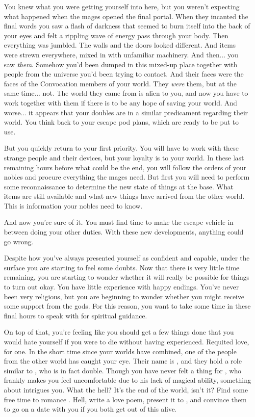 \documentclass[char]{guildcamp3}
\begin{document}
You knew what you were getting yourself into here, but you weren't expecting what happened when the mages opened the final portal. When they incanted the final words you saw a flash of darkness that seemed to burn itself into the back of your eyes and felt a rippling wave of energy pass through your body. Then everything was jumbled. The walls and the doors looked different. And items were strewn everywhere, mixed in with unfamiliar machinery. And then... you saw \emph{them}. Somehow you'd been dumped in this mixed-up place together with people from the universe you'd been trying to contact. And their faces were the faces of the Convocation members of your world. They \emph{were} them, but at the same time... not. The world they came from is alien to you, and now you have to work together with them if there is to be any hope of saving your world. And worse... it appears that your doubles are in a similar predicament regarding their world. You think back to your escape pod plans, which are ready to be put to use.

But you quickly return to your first priority. You will have to work with these strange people and their devices, but your loyalty is to your world. In these last remaining hours before what could be the end, you will follow the orders of your nobles and procure everything the mages need. But first you will need to perform some reconnaissance to determine the new state of things at the base. What items are still available and what new things have arrived from the other world. This is information your nobles need to know.

And now you're sure of it. You must find time to make the escape vehicle in between doing your other duties. With these new developments, anything could go wrong.

Despite how you've always presented yourself as confident and capable, under the surface you are starting to feel some doubts. Now that there is very little time remaining, you are starting to wonder whether it will really be possible for things to turn out okay. You have little experience with happy endings. You've never been very religious, but you are beginning to wonder whether you might receive some support from the gods. For this reason, you want to take some time in these final hours to speak with \cPaladin{} for spiritual guidance.

On top of that, you're feeling like you should get a few things done that you would hate yourself if you were to die without having experienced. Requited love, for one. In the short time since your worlds have combined, one of the people from the other world has caught your eye. Their name is \cPoliOne{}, and they hold a role similar to \cNobleOne{}, who is in fact \cPoliOne{\their} double. Though you have never felt a thing for \cNobleOne{}, who frankly makes you feel uncomfortable due to his lack of magical ability, something about \cPoliOne{} intrigues you. What the hell? It's the end of the world, isn't it? Find some free time to romance \cPoliOne{\them}. Hell, write \cPoliOne{\them} a love poem, present it to \cPoliOne{\them}, and convince them to go on a date with you if you both get out of this alive. 
\end{document}
